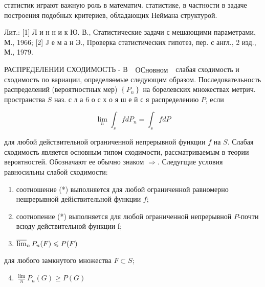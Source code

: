 \documentclass[10pt]{article}
\begin{document}
статистик играют важную роль в математич. статистике, в частности в задаче построения подобных критериев, обладающих Неймана структурой.



Лит.: [1] Л и н н и к Ю. В., Статистические задачи с мешающими параметрами, М., 1966; [2] J е м а н Э., Проверка статистических гипотез, пер. с англ., 2 изд., М., 1979.



РАСПРЕДЕЛЕНИИ СХОДИМОСТЬ - В $\begin{gathered}\text { ОСновном }\end{gathered}$ слабая сходимость и сходимость по вариации, определяөмые следующим образом. Последовательность распределений (вероятностных мер) $\left\{P_{n}\right\}$ на борелевских множествах метрич. пространства $S$ наз. с л а 6 о с х о я ш е й с я распределению $P$, если



\[

\lim _{n} \int_{s} f d P_{n}=\int_{s} f d P

\]



для любой действительной ограниченной непрерывной функции $f$ на $S$. Слабая сходимость является основным типом сходимости, рассматриваемым в теории вероятностей. Обозначают ее обычно знаком $\Rightarrow$. Следугщие условия равносильны слабой сходимости:



\begin{enumerate}

  \item соотношение (*) выполняется для любой ограниченной равномерно нешрерывной дейіствительной функции $f$;



  \item соотнопение (*) выполняется для любой ограниченной непрерывной $P$-почти всюду действительной функции f;



  \item $\varlimsup_{n} P_{n}(F) \leqslant P(F)$



\end{enumerate}



для любого замкнутого множества $F \subset S$;



\begin{enumerate}

  \setcounter{enumi}{3}

  \item $\frac{\lim }{n} P_{n}(G) \geqslant P(G)$

\end{enumerate}
\end{document}
